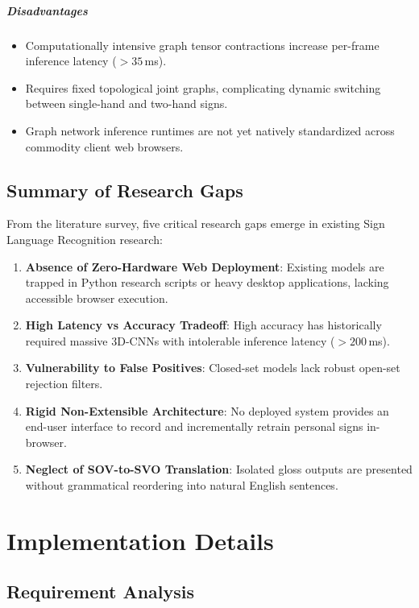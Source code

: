 \paragraph{Disadvantages}
\begin{itemize}
    \item Computationally intensive graph tensor contractions increase per-frame inference latency ($>35$\,ms).
    \item Requires fixed topological joint graphs, complicating dynamic switching between single-hand and two-hand signs.
    \item Graph network inference runtimes are not yet natively standardized across commodity client web browsers.
\end{itemize}

\section{Summary of Research Gaps}

From the literature survey, five critical research gaps emerge in existing Sign Language Recognition research:
\begin{enumerate}
    \item \textbf{Absence of Zero-Hardware Web Deployment}: Existing models are trapped in Python research scripts or heavy desktop applications, lacking accessible browser execution.
    \item \textbf{High Latency vs Accuracy Tradeoff}: High accuracy has historically required massive 3D-CNNs with intolerable inference latency ($>200$\,ms).
    \item \textbf{Vulnerability to False Positives}: Closed-set models lack robust open-set rejection filters.
    \item \textbf{Rigid Non-Extensible Architecture}: No deployed system provides an end-user interface to record and incrementally retrain personal signs in-browser.
    \item \textbf{Neglect of SOV-to-SVO Translation}: Isolated gloss outputs are presented without grammatical reordering into natural English sentences.
\end{enumerate}

\chapter{Implementation Details}

\section{Requirement Analysis}


